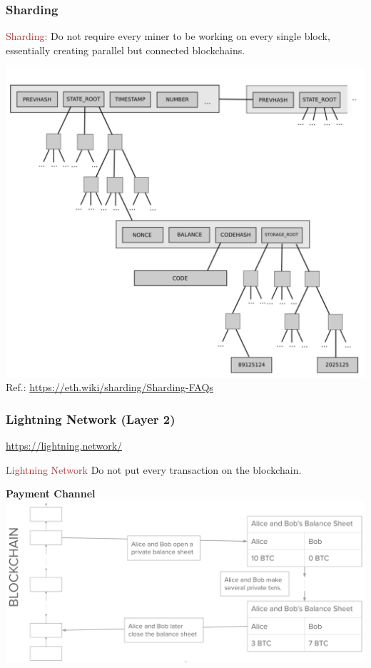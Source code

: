 \documentclass{beamer}
\begin{document}
\begin{frame}
  \frametitle{Sharding}
  \begin{block}{\textcolor{brown}{Sharding:}} 
  Do not require every miner to be working on every single block, essentially creating parallel but connected blockchains.
  \end{block}
  \pause	
  
 	\centering
	\includegraphics[scale=0.23]{sharding} \\
{\tiny{Ref.: \url{https://eth.wiki/sharding/Sharding-FAQs}}}
\end{frame}
\begin{frame}
  \frametitle{Lightning Network (Layer 2)}
  \url{https://lightning.network/}
  \pause
  \begin{block}{\textcolor{brown}{Lightning Network}}
  Do not put every transaction on the blockchain.
  \end{block}
 \pause
 \textbf{Payment Channel}	
 \centering
	\includegraphics[scale=0.23]{payment}
\end{frame}
\end{document}
